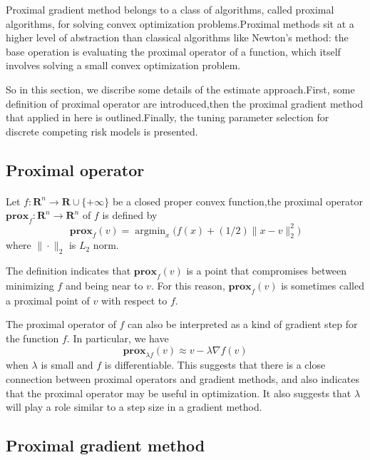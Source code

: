 \documentclass[]{article}
\DeclareMathOperator*{\argmin}{argmin}
\begin{document}
    Proximal gradient method belongs to a class of algorithms, called proximal algorithms, for solving convex optimization problems.Proximal methods sit at a higher level of abstraction than classical algorithms like Newton's method: the base operation is evaluating the proximal operator of a function, which itself involves solving a small convex optimization problem.
    
    So in this section, we discribe some details of the estimate approach.First, some definition of proximal operator are introduced,then the proximal gradient method that applied in here is outlined.Finally, the tuning parameter selection for discrete competing risk models is presented.
    \subsection{Proximal operator}
    \paragraph{}Let $f:\bm{R}^n\to \bm{R}\cup\{+\infty\}$ be a closed proper convex function,the proximal operator $\mathbf{prox}_f:\bm{R}^n\to \bm{R}^n$ of $f$ is defined by
    \begin{equation}
    \mathbf{prox}_f(v) = \mathop{\argmin}_x\Big(f(x)+(1/2)\rVert x-v\rVert_2^2\Big)
    \end{equation}
    where $\rVert \cdot\rVert_2$ is $L_2$ norm.
    
    The definition indicates that $\mathbf{prox}_f(v)$ is a point that compromises between minimizing $f$ and being near to $v$. For this reason, $\mathbf{prox}_f(v)$ is sometimes called a proximal point of $v$ with respect to $f$.
    
    The proximal operator of $f$ can also be interpreted as a kind of gradient step for the function $f$. In particular, we have
    \begin{equation}
    \mathbf{prox}_{\lambda f}(v)\approx v-\lambda\nabla f(v)
    \end{equation}
    when $\lambda$ is small and $f$ is differentiable. This suggests that there is a close connection between proximal operators and gradient methods, and also indicates that the proximal operator may be useful in optimization. It also suggests that $\lambda$ will play a role similar to a step size in a gradient method.
    
    \subsection{Proximal gradient method}
\end{document}
